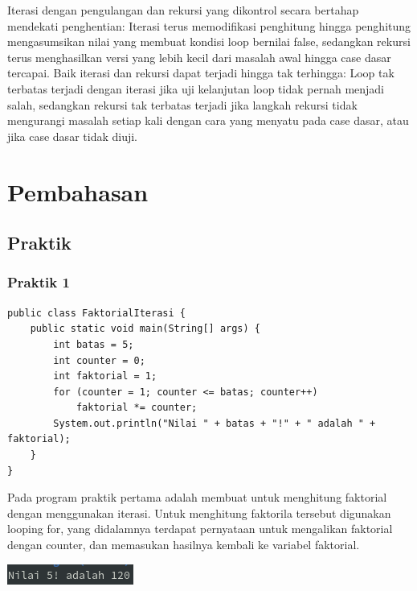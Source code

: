 \documentclass[a4paper,12pt]{article}
\begin{document}
Iterasi dengan pengulangan dan rekursi yang dikontrol secara bertahap mendekati penghentian: Iterasi terus memodifikasi
penghitung hingga penghitung mengasumsikan nilai yang membuat kondisi loop bernilai false, sedangkan rekursi terus
menghasilkan versi yang lebih kecil dari masalah awal hingga case dasar tercapai. Baik iterasi dan rekursi dapat terjadi
hingga tak terhingga: Loop tak terbatas terjadi dengan iterasi jika uji kelanjutan loop tidak pernah menjadi salah,
sedangkan rekursi tak terbatas terjadi jika langkah rekursi tidak mengurangi masalah setiap kali dengan cara yang
menyatu pada case dasar, atau jika case dasar tidak diuji.

\newpage

\section{Pembahasan}
\subsection{Praktik}
\subsubsection{Praktik 1}
\begin{lstlisting}
public class FaktorialIterasi {
    public static void main(String[] args) {
        int batas = 5;
        int counter = 0;
        int faktorial = 1;
        for (counter = 1; counter <= batas; counter++)
            faktorial *= counter;
        System.out.println("Nilai " + batas + "!" + " adalah " + faktorial);
    }
}
\end{lstlisting}

Pada program praktik pertama adalah membuat untuk menghitung faktorial dengan menggunakan iterasi. Untuk menghitung
faktorila tersebut digunakan looping for, yang didalamnya terdapat pernyataan untuk mengalikan faktorial dengan counter,
dan memasukan hasilnya kembali ke variabel faktorial.

\begin{center}
    \includegraphics[scale=1]{1.png} 
\end{center}
\end{document}

